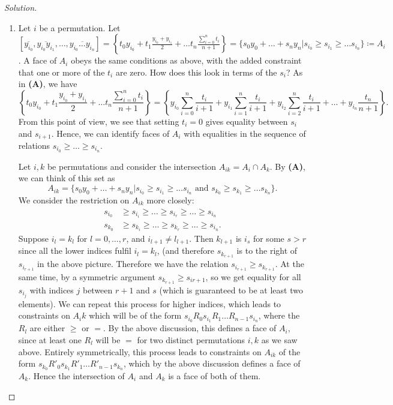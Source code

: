 \begin{proof}[Solution]
\begin{enumerate}[font=\scshape,label=\textbf{(\Alph*)}, wide]
\item Let $i$ be a permutation. Let $[\overline{y_{i_0}}, \overline{y_{i_0}y_{i_1}}, \ldots , \overline{y_{i_0}\ldots y_{i_n}}] = \left\{t_0 y_{i_0} + t_1 \frac{y_{i_0} + y_{i_1} }{2} + \ldots t_n\frac{\sum_{i=0}^n t_i}{n+1}\right\} = \{s_0 y_0 + \ldots + s_n y_n | s_{i_0} \geq s_{i_1} \geq \ldots s_{i_n} \} \coloneqq A_i$.
A face of $A_i$ obeys the same conditions as above, with the added constraint that one or more of the $t_i$ are zero. How does this look in terms of the $s_i$? As in \textbf{(A)}, we have
\[
\left\{t_0 y_{i_0} + t_1 \frac{y_{i_0} + y_{i_1} }{2} + \ldots t_n\frac{\sum_{i=0}^n t_i}{n+1}\right\} = \left\{y_{i_0}\sum_{i = 0}^n\frac{t_i}{i+1} + y_{i_1} \sum_{i = 1}^n\frac{t_i}{i+1} +y_{i_2} \sum_{i = 2}^n\frac{t_i}{i+1} + \ldots + y_{i_n}\frac{t_n}{n+1}\right\}.
\]
From this point of view, we see that setting $t_i = 0$ gives equality between $s_i$ and $s_{i+1}$. Hence, we can identify faces of $A_i$ with equalities in the sequence of relations $s_{i_0} \geq \ldots \geq s_{i_n}$.

Let $i, k$ be permutations and consider the intersection $A_{ik} = A_i\cap A_k$. By \textbf{(A)}, we can think of this set as
\[
A_{ik} = \{s_0 y_0 + \ldots + s_n y_n | s_{i_0} \geq s_{i_1} \geq \ldots s_{i_n} \text{ and }  s_{k_0} \geq s_{k_1} \geq \ldots s_{k_n}\}.
\]
We consider the restriction on $A_{ik}$ more closely:
\[
\begin{aligned}
s_{i_0} &\geq s_{i_i} \geq \ldots \geq s_{i_r} \geq \ldots \geq s_{i_n} \\
s_{k_0} &\geq s_{k_i} \geq \ldots \geq s_{k_r} \geq \ldots \geq s_{i_n}.
\end{aligned}
\]
 Suppose $i_l = k_l$ for $l = 0,\ldots, r$, and $i_{l+1} \neq l_{l+1}$. Then $k_{l+1}$ is $i_s$ for some $s>r$ since all the lower indices fulfil $i_l = k_l$, (and therefore $s_{k_{r+1}}$ is to the right of $s_{i_{r+1}}$ in the above picture. Therefore we have the relation $s_{i_{r+1}} \geq s_{k_{r+1}}$. At the same time, by a symmetric argument $s_{k_{r+1}} \geq s_{i{r+1}}$, so we get equality for all $s_{i_j}$ with indices $j$ between $r+1$ and $s$ (which is guaranteed to be at least two elements). We can repeat this process for higher indices, which leads to constraints on $A_ik$ which will be of the form $s_{i_0} R_0 s_{i_1} R_{1} \ldots R_{n-1} s_{i_n}$, where the $R_l$ are either $\geq$ or $=$. By the above discussion, this defines a face of $A_i$, since at least one $R_l$ will be $=$ for two distinct permutations $i, k$ as we saw above. Entirely symmetrically, this process leads to constraints on $A_{ik}$ of the form $s_{k_0} R'_0 s_{k_1} R'_{1} \ldots R'_{n-1} s_{k_n}$, which by the above discussion defines a face of $A_k$. Hence the intersection of $A_i$ and $A_k$ is a face of both of them.



\end{enumerate}
\end{proof}
